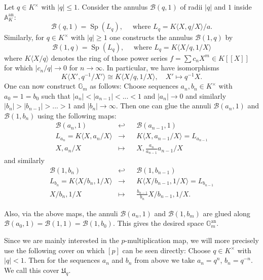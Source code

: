 \documentclass[11pt,oneside]{amsart}
\theoremstyle{definition}
\theoremstyle{remark}
\begin{document}
	Let $q \in K^\times$ with $|q|\leq 1$. Consider the annulus $\mathcal B(q,1)$ of radii $|q|$ and $1$ inside $\mathbb A_K^{\operatorname{an}}$:
	\[\mathcal B(q,1) = \operatorname{Sp}(L_q),\quad \text{ where } L_q = K\langle X,q/X\rangle/a. \]
	Similarly, for $q\in K^\times$ with $|q|\geq 1$ one constructs the annulus $\mathcal B(1,q)$ by
	\[\mathcal B(1,q) = \operatorname{Sp}(L_{q}),\quad \text{ where } L_{q} = K\langle X/q,1/X\rangle\]
	where $K\langle X/q\rangle$ denotes the ring of those power series $f=\sum c_nX^m\in K[[X]]$ for which $|c_n/q|\to 0$ for $n\to \infty$. In particular, we have isomorphisms
	 \[K\langle X',q^{-1}/X'\rangle\cong K\langle X/q,1/X\rangle,\quad X'\mapsto q^{-1}X.\]
	One can now construct $\mathbb G_m$ as follows: Choose sequences $a_n,b_n\in K^\times$ with $a_0=1=b_0$ such that $|a_n|<|a_{n-1}|<...<1$ and $|a_n| \to 0$ and similarly $|b_n|>|b_{n-1}|>...>1$ and $|b_n| \to \infty$. Then one can glue the annuli $\mathcal B(a_n,1)$ and $\mathcal B(1,b_n)$ using the following maps:
	\begin{equation}\label{torus explicit cover glue map 1}
	\begin{alignedat}{2}
	\mathcal B(a_{n},1)&\hookleftarrow&& \mathcal B(a_{n-1},1)\\
	L_{a_n}=K\langle X,a_n/X\rangle&\rightarrow &&K\langle X,a_{n-1}/X\rangle=L_{a_{n-1}}\\
	X,a_{n}/X&\mapsto&& X, \frac{a_{n}}{a_{n-1}}a_{n-1}/X
	\end{alignedat}
	\end{equation}
	and similarly 
	\begin{equation}\label{torus explicit cover glue map 2}
	\begin{alignedat}{2}
	\mathcal B(1,b_n)&\hookleftarrow&& \mathcal B(1,b_{n-1})\\
	L_{b_n}=K\langle  X/b_{n},1/X\rangle&\rightarrow &&K\langle X/b_{n-1},1/X\rangle=L_{b_{n-1}}\\
	X/b_{n},1/X&\mapsto&& \frac{b_{n-1}}{b_{n}} X/b_{n-1}, 1/X.
	\end{alignedat}
	\end{equation}
	
	Also, via the above maps, the annuli $\mathcal B(a_n,1)$ and $\mathcal B(1,b_m)$ are glued along $\mathcal B(a_0,1)=\mathcal B(1,1)=\mathcal B(1,b_0).$ This gives the desired space $\mathbb{G}_m^{\operatorname{an}}$.
	
	Since we are mainly interested in the $p$-multiplication map, we will more precisely use the following cover on which $[p]$ can be seen directly: Choose $q\in K^\times$ with $|q|<1$. Then for the sequences $a_n$ and $b_n$ from above we take $a_n = q^n$, $b_n = q^{-n}$. 
	We call this cover $\mathfrak U_q$.
	
\end{document}
